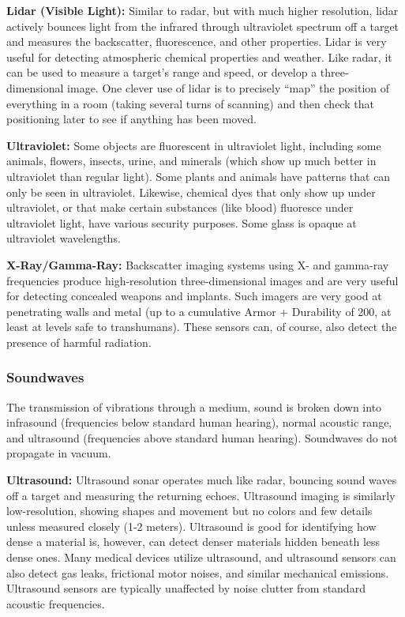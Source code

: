 \textbf{Lidar (Visible Light):} Similar to radar, but with much higher resolution, lidar actively bounces light from the infrared through ultraviolet spectrum off a target and measures the backscatter, fluorescence, and other properties. Lidar is very useful for detecting atmospheric chemical properties and weather. Like radar, it can be used to measure a target’s range and speed, or develop a three-dimensional image. One clever use of lidar is to precisely ``map'' the position of everything in a room (taking several turns of scanning) and then check that positioning later to see if anything has been moved.

\textbf{Ultraviolet:} Some objects are fluorescent in ultraviolet light, including some animals, flowers, insects, urine, and minerals (which show up much better in ultraviolet than regular light). Some plants and animals have patterns that can only be seen in ultraviolet. Likewise, chemical dyes that only show up under ultraviolet, or that make certain substances (like blood) fluoresce under ultraviolet light, have various security purposes. Some glass is opaque at ultraviolet wavelengths.

\textbf{X-Ray/Gamma-Ray:} Backscatter imaging systems using X- and gamma-ray frequencies produce high-resolution three-dimensional images and are very useful for detecting concealed weapons and implants. Such imagers are very good at penetrating walls and metal (up to a cumulative Armor + Durability of 200, at least at levels safe to transhumans). These sensors can, of course, also detect the presence of harmful radiation.

\subsubsection{Soundwaves}

The transmission of vibrations through a medium, sound is broken down into infrasound (frequencies below standard human hearing), normal acoustic range, and ultrasound (frequencies above standard human hearing). Soundwaves do not propagate in vacuum.

\textbf{Ultrasound:} Ultrasound sonar operates much like radar, bouncing sound waves off a target and measuring the returning echoes. Ultrasound imaging is similarly low-resolution, showing shapes and movement but no colors and few details unless measured closely (1-2 meters). Ultrasound is good for identifying how dense a material is, however, can detect denser materials hidden beneath less dense ones. Many medical devices utilize ultrasound, and ultrasound sensors can also detect gas leaks, frictional motor noises, and similar mechanical emissions. Ultrasound sensors are typically unaffected by noise clutter from standard acoustic frequencies.

